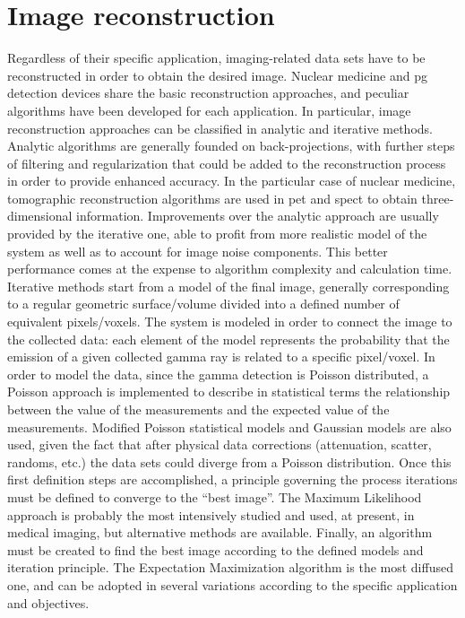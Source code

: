 \section{Image reconstruction}\label{chap2::sec::Image_reconstruction}

Regardless of their specific application, imaging-related data sets have to be reconstructed in order to obtain the desired image. Nuclear medicine and \gls{pg} detection devices share the basic reconstruction approaches, and peculiar algorithms have been developed for each application. In particular, image reconstruction approaches can be classified in analytic and iterative methods. Analytic algorithms are generally founded on back-projections, with further steps of filtering and regularization that could be added to the reconstruction process in order to provide enhanced accuracy. In the particular case of nuclear medicine, tomographic reconstruction algorithms are used in \gls{pet} and \gls{spect} to obtain three-dimensional information. Improvements over the analytic approach are usually provided by the iterative one, able to profit from more realistic model of the system as well as to account for image noise components. This better performance comes at the expense to algorithm complexity and calculation time. Iterative methods start from a model of the final image, generally corresponding to a regular geometric surface/volume divided into a defined number of equivalent pixels/voxels. The system is modeled in order to connect the image to the collected data: each element of the model represents the probability that the emission of a given collected gamma ray is related to a specific pixel/voxel. In order to model the data, since the gamma detection is Poisson distributed, a Poisson approach is implemented to describe in statistical terms the relationship between the value of the measurements and the expected value of the measurements. Modified Poisson statistical models and Gaussian models are also used, given the fact that after physical data corrections (attenuation, scatter, randoms, etc.) the data sets could diverge from a Poisson distribution. Once this first definition steps are accomplished, a principle governing the process iterations must be defined to converge to the \enquote{best image}. The Maximum Likelihood approach is probably the most intensively studied and used, at present, in medical imaging, but alternative methods are available. Finally, an algorithm must be created to find the best image according to the defined models and iteration principle. The Expectation Maximization algorithm is the most diffused one, and can be adopted in several variations according to the specific application and objectives. 


